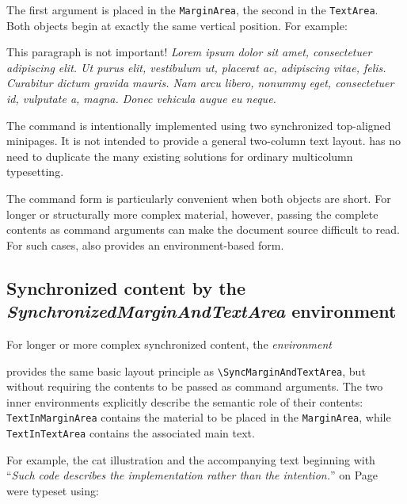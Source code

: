 \documentclass[
11pt,
a4paper,
oneside
]{scrbook}
\begin{document}


The first argument is placed in the \texttt{MarginArea}, the second
in the \texttt{TextArea}. Both objects begin at exactly the same
vertical position.
For example:




\SyncMarginAndTextArea
{This paragraph is not important!}
{\emph{Lorem ipsum dolor sit amet, consectetuer adipiscing elit. Ut purus elit, vestibulum ut, placerat ac, adipiscing vitae, felis. Curabitur dictum gravida mauris. Nam arcu libero, nonummy eget, consectetuer id, vulputate a, magna. Donec vehicula augue eu neque.}}

\vspace{2ex}

\noindent
The command is intentionally implemented using two synchronized
top-aligned minipages. It is not intended to provide a general
two-column text layout. \MDWordmark has no need to duplicate the many
existing solutions for ordinary multicolumn typesetting.

The command form is particularly convenient when both objects are
short. For longer or structurally more complex material, however,
passing the complete contents as command arguments can make the
document source difficult to read. For such cases, \MDWordmark also
provides an environment-based form.

\subsection{Synchronized content by the \emph{SynchronizedMarginAndTextArea} environment}

For longer or more complex synchronized content, the \emph{environment}




provides the same basic layout principle as
\texttt{\textbackslash{}SyncMarginAndTextArea}, but without requiring the
contents to be passed as command arguments.
The two inner environments explicitly describe the semantic role of
their contents: \texttt{TextInMarginArea} contains the material to be
placed in the \texttt{MarginArea}, while \texttt{TextInTextArea}
contains the associated main text.

For example, the cat illustration and the accompanying text beginning
with ``\emph{Such code describes the implementation rather than the
	intention.}'' on Page~ were
typeset using:


\end{document}
